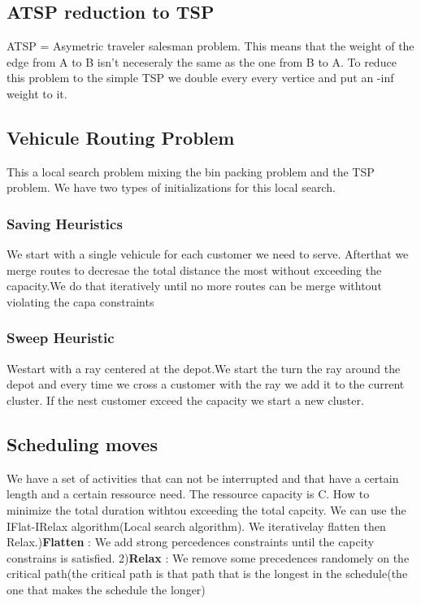 \subsection{ATSP reduction to TSP}
ATSP = Asymetric traveler salesman problem.
This means that the weight of the edge from A to B isn't neceseraly the same as the one from B to A. To reduce this problem to the simple TSP we double every every vertice and put an -inf weight to it.\newline

\subsection{Vehicule Routing Problem}
This a local search problem mixing the bin packing problem and the TSP problem.
We have two types of initializations for this local search.\newline
\subsubsection{Saving Heuristics}
We start with a single vehicule for each customer we need to serve.
Afterthat we merge routes to decresae the total distance the most without exceeding the capacity.We do that iteratively until no more routes can be merge withtout violating the capa constraints\newline

\subsubsection{Sweep Heuristic}
Westart with a ray centered at the depot.We start the turn the ray around the depot and every time we cross a customer with the ray we add it to the current cluster. If the nest customer exceed the capacity we start a new cluster.\newline

\subsection{Scheduling moves}
We have a set of activities that can not be interrupted and that have a certain length and a certain ressource need.
The ressource capacity is C.
How to minimize the total duration withtou exceeding the total capcity.\newline
We can use the IFlat-IRelax algorithm(Local search algorithm).\newline
We iterativelay flatten then Relax.)\textbf{Flatten} : We add strong percedences constraints until the capcity constrains is satisfied.
2)\textbf{Relax} : We remove some precedences randomely on the critical path(the critical path is that path that is the longest in the schedule(the one that makes the schedule the longer)

